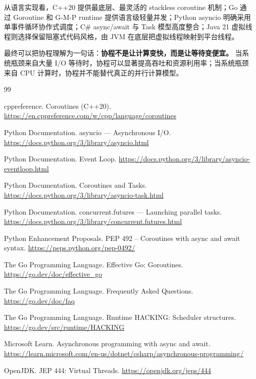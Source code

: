 \documentclass[UTF8,zihao=-4]{ctexart}
\begin{document}
从语言实现看，C++20 提供最底层、最灵活的 stackless coroutine 机制；Go 通过 Goroutine 和 G-M-P runtime 提供语言级轻量并发；Python asyncio 明确采用单事件循环协作式调度；C\# async/await 与 Task 模型高度整合；Java 21 虚拟线程则选择保留阻塞式代码风格，由 JVM 在底层把虚拟线程映射到平台线程。

最终可以把协程理解为一句话：\textbf{协程不是让计算变快，而是让等待变便宜。} 当系统瓶颈来自大量 I/O 等待时，协程可以显著提高吞吐和资源利用率；当系统瓶颈来自 CPU 计算时，协程并不能替代真正的并行计算模型。

\begin{thebibliography}{99}

cppreference.
\newblock Coroutines (C++20).
\newblock \url{https://en.cppreference.com/w/cpp/language/coroutines}

Python Documentation.
\newblock asyncio --- Asynchronous I/O.
\newblock \url{https://docs.python.org/3/library/asyncio.html}

Python Documentation.
\newblock Event Loop.
\newblock \url{https://docs.python.org/3/library/asyncio-eventloop.html}

Python Documentation.
\newblock Coroutines and Tasks.
\newblock \url{https://docs.python.org/3/library/asyncio-task.html}

Python Documentation.
\newblock concurrent.futures --- Launching parallel tasks.
\newblock \url{https://docs.python.org/3/library/concurrent.futures.html}

Python Enhancement Proposals.
\newblock PEP 492 -- Coroutines with async and await syntax.
\newblock \url{https://peps.python.org/pep-0492/}

The Go Programming Language.
\newblock Effective Go: Goroutines.
\newblock \url{https://go.dev/doc/effective_go}

The Go Programming Language.
\newblock Frequently Asked Questions.
\newblock \url{https://go.dev/doc/faq}

The Go Programming Language.
\newblock Runtime HACKING: Scheduler structures.
\newblock \url{https://go.dev/src/runtime/HACKING}

Microsoft Learn.
\newblock Asynchronous programming with async and await.
\newblock \url{https://learn.microsoft.com/en-us/dotnet/csharp/asynchronous-programming/}

OpenJDK.
\newblock JEP 444: Virtual Threads.
\newblock \url{https://openjdk.org/jeps/444}


\end{thebibliography}
\end{document}
